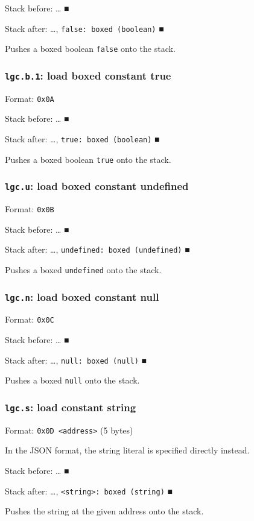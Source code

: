 Stack before: \ldots{}​ ■

Stack after: \ldots{}​, \texttt{false: boxed (boolean)} ■

Pushes a boxed boolean \texttt{false} onto the stack.

\subsubsection{\texttt{lgc.b.1}: load boxed constant true}
\label{sec:org79cc95f}
Format: \texttt{0x0A}

Stack before: \ldots{}​ ■

Stack after: \ldots{}​, \texttt{true: boxed (boolean)} ■

Pushes a boxed boolean \texttt{true} onto the stack.

\subsubsection{\texttt{lgc.u}: load boxed constant undefined}
\label{sec:org5d44e29}
Format: \texttt{0x0B}

Stack before: \ldots{}​ ■

Stack after: \ldots{}​, \texttt{undefined: boxed (undefined)} ■

Pushes a boxed \texttt{undefined} onto the stack.

\subsubsection{\texttt{lgc.n}: load boxed constant null}
\label{sec:org1969f37}
Format: \texttt{0x0C}

Stack before: \ldots{}​ ■

Stack after: \ldots{}​, \texttt{null: boxed (null)} ■

Pushes a boxed \texttt{null} onto the stack.

\subsubsection{\texttt{lgc.s}: load constant string}
\label{sec:org2f69311}
Format: \texttt{0x0D <address>} (5 bytes)

In the JSON format, the string literal is specified directly instead.

Stack before: \ldots{}​ ■

Stack after: \ldots{}​, \texttt{<string>: boxed (string)} ■

Pushes the string at the given address onto the stack.


